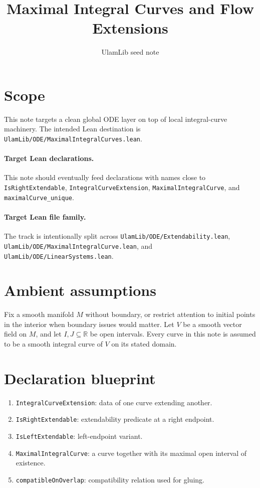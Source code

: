 \documentclass[11pt]{article}
\title{Maximal Integral Curves and Flow Extensions}
\author{UlamLib seed note}
\date{}
\begin{document}
\maketitle

\section{Scope}

This note targets a clean global ODE layer on top of local integral-curve
machinery. The intended Lean destination is
\texttt{UlamLib/ODE/MaximalIntegralCurves.lean}.

\paragraph{Target Lean declarations.}
This note should eventually feed declarations with names close to
\texttt{IsRightExtendable}, \texttt{IntegralCurveExtension},
\texttt{MaximalIntegralCurve}, and \texttt{maximalCurve\_unique}.

\paragraph{Target Lean file family.}
The track is intentionally split across
\texttt{UlamLib/ODE/Extendability.lean},
\texttt{UlamLib/ODE/MaximalIntegralCurve.lean}, and
\texttt{UlamLib/ODE/LinearSystems.lean}.

\section{Ambient assumptions}

Fix a smooth manifold $M$ without boundary, or restrict attention to initial
points in the interior when boundary issues would matter. Let $V$ be a smooth
vector field on $M$, and let $I,J \subseteq \mathbb{R}$ be open intervals.
Every curve in this note is assumed to be a smooth integral curve of $V$ on
its stated domain.

\section{Declaration blueprint}

\begin{enumerate}
\item \texttt{IntegralCurveExtension}: data of one curve extending another.
\item \texttt{IsRightExtendable}: extendability predicate at a right endpoint.
\item \texttt{IsLeftExtendable}: left-endpoint variant.
\item \texttt{MaximalIntegralCurve}: a curve together with its maximal open
interval of existence.
\item \texttt{compatibleOnOverlap}: compatibility relation used for gluing.
\end{enumerate}
\end{document}
